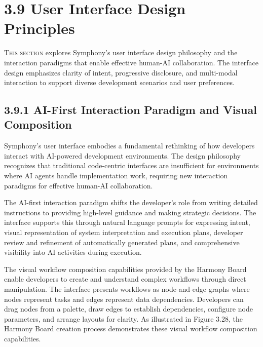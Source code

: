 \clearpage
\section{3.9 User Interface Design Principles}
\label{sec:ui-design}

\lettrine{T}{his section} explores Symphony's user interface design philosophy and the interaction paradigms that enable effective human-AI collaboration. The interface design emphasizes clarity of intent, progressive disclosure, and multi-modal interaction to support diverse development scenarios and user preferences.

\subsection*{3.9.1 AI-First Interaction Paradigm and Visual Composition}

Symphony's user interface embodies a fundamental rethinking of how developers interact with AI-powered development environments. The design philosophy recognizes that traditional code-centric interfaces are insufficient for environments where AI agents handle implementation work, requiring new interaction paradigms for effective human-AI collaboration.

The AI-first interaction paradigm shifts the developer's role from writing detailed instructions to providing high-level guidance and making strategic decisions. The interface supports this through natural language prompts for expressing intent, visual representation of system interpretation and execution plans, developer review and refinement of automatically generated plans, and comprehensive visibility into AI activities during execution.

The visual workflow composition capabilities provided by the Harmony Board enable developers to create and understand complex workflows through direct manipulation. The interface presents workflows as node-and-edge graphs where nodes represent tasks and edges represent data dependencies. Developers can drag nodes from a palette, draw edges to establish dependencies, configure node parameters, and arrange layouts for clarity. As illustrated in Figure 3.28, the Harmony Board creation process demonstrates these visual workflow composition capabilities.

